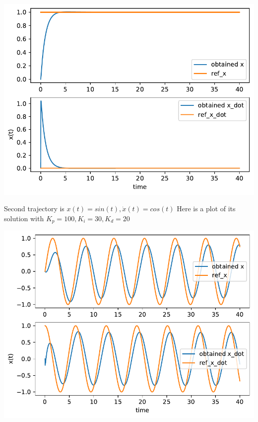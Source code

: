 \documentclass[a4paper,12pt]{article}
\begin{document}
    \begin{center}
        \includegraphics[width=0.8\linewidth]{PID100-30-20.pdf}
    \end{center}
    Second trajectory is $x(t)=sin(t), \dot x(t) = cos(t)$
    Here is a plot of its solution with $K_p = 100, K_i = 30, K_d = 20$
    \begin{center}
        \includegraphics[width=0.8\linewidth]{2PID100-30-20.pdf}
    \end{center}
\end{document}
